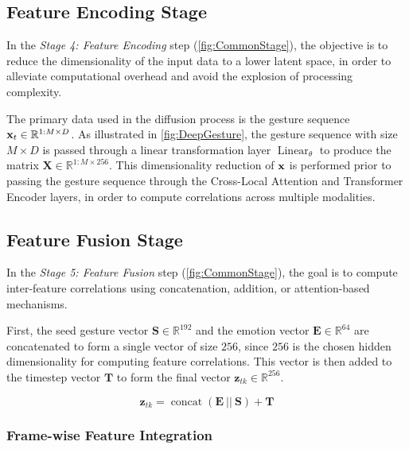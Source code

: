\subsection{Feature Encoding Stage}

In the \textit{Stage 4: Feature Encoding} step (\autoref{fig:CommonStage}), the objective is to reduce the dimensionality of the input data to a lower latent space, in order to alleviate computational overhead and avoid the explosion of processing complexity.

The primary data used in the diffusion process is the gesture sequence $\mathbf{x}_t \in \mathbb{R}^{1:M \times D}$. As illustrated in \autoref{fig:DeepGesture}, the gesture sequence with size $M \times D$ is passed through a linear transformation layer $\operatorname{Linear}_{\theta}$ to produce the matrix $\mathbf{X} \in \mathbb{R}^{1:M \times 256}$. This dimensionality reduction of $\mathbf{x}$ is performed prior to passing the gesture sequence through the Cross-Local Attention and Transformer Encoder layers, in order to compute correlations across multiple modalities.

\subsection{Feature Fusion Stage}

In the \textit{Stage 5: Feature Fusion} step (\autoref{fig:CommonStage}), the goal is to compute inter-feature correlations using concatenation, addition, or attention-based mechanisms.

First, the seed gesture vector $\mathbf{S} \in \mathbb{R}^{192}$ and the emotion vector $\mathbf{E} \in \mathbb{R}^{64}$ are concatenated to form a single vector of size $256$, since $256$ is the chosen hidden dimensionality for computing feature correlations. This vector is then added to the timestep vector $\mathbf{T}$ to form the final vector $\mathbf{z}_{tk} \in \mathbb{R}^{256}$.


\begin{equation}
	\label{eq:ConditionConcat}
	\mathbf{z}_{tk} = \operatorname{concat }(\mathbf{E}\ || \  \mathbf{S}) + \mathbf{T}
\end{equation}


\subsubsection{Frame-wise Feature Integration}

